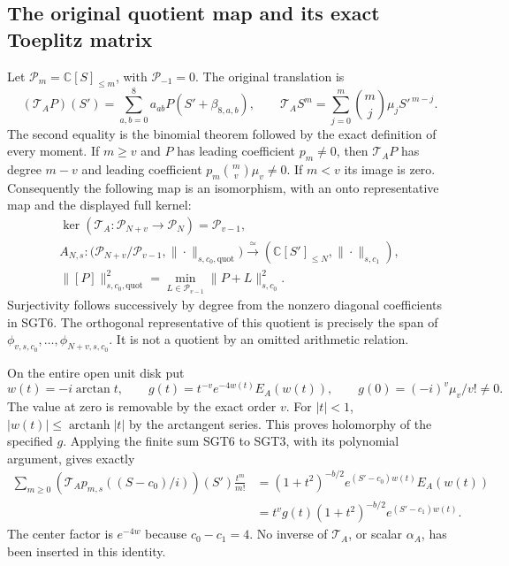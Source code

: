 \documentclass[10pt]{article}
\begin{document}
\subsection{The original quotient map and its exact Toeplitz matrix}

Let $\mathcal P_m=\mathbb C[S]_{\le m}$, with
$\mathcal P_{-1}=0$. The original translation is
\[
 (\mathcal T_AP)(S')=\sum_{a,b=0}^8
                 a_{ab}P(S'+\beta_{8,a,b}),\qquad
 \mathcal T_AS^m=
       \sum_{j=0}^m\binom mj\mu_jS'^{\,m-j}.
 \tag{SGT6}
\]
The second equality is the binomial theorem followed by the exact
definition of every moment. If $m\ge v$ and $P$ has leading coefficient
$p_m\ne0$, then $\mathcal T_AP$ has degree $m-v$ and leading coefficient
$p_m\binom mv\mu_v\ne0$. If $m<v$ its image is zero.
Consequently the following map is an isomorphism, with an onto
representative map and the displayed full kernel:
\[
\begin{gathered}
 \ker(\mathcal T_A:\mathcal P_{N+v}\longrightarrow\mathcal P_N)
       =\mathcal P_{v-1},\\
 A_{N,s}:\bigl(\mathcal P_{N+v}/\mathcal P_{v-1},
                       \|\cdot\|_{s,c_0,\mathrm{quot}}\bigr)
       \xrightarrow{\ \simeq\ }
                (\mathbb C[S']_{\le N},\|\cdot\|_{s,c_1}),\\
 \|[P]\|_{s,c_0,\mathrm{quot}}^2
       =\min_{L\in\mathcal P_{v-1}}\|P+L\|_{s,c_0}^2 .
\end{gathered}\tag{SGT7}
\]
Surjectivity follows successively by degree from the nonzero diagonal
coefficients in SGT6. The orthogonal representative of this quotient
is precisely the span of $\phi_{v,s,c_0},\ldots,\phi_{N+v,s,c_0}$.
It is not a quotient by an omitted arithmetic relation.

On the entire open unit disk put
\[
 w(t)=-i\arctan t,\qquad
 g(t)=t^{-v}e^{-4w(t)}E_A(w(t)),\qquad
 g(0)=(-i)^v\mu_v/v!\ne0 .
 \tag{SGT8}
\]
The value at zero is removable by the exact order $v$.
For $|t|<1$, $|w(t)|\le\operatorname{arctanh}|t|$ by the
arctangent series. This proves holomorphy of the specified $g$.
Applying the finite sum SGT6 to SGT3, with its polynomial argument,
gives exactly
\[
\begin{split}
 \sum_{m\ge0}(\mathcal T_Ap_{m,s}((S-c_0)/i))(S')
                   \frac{t^m}{m!}
 &= (1+t^2)^{-b/2}e^{(S'-c_0)w(t)}E_A(w(t))\\
 &=t^vg(t)(1+t^2)^{-b/2}e^{(S'-c_1)w(t)} .
\end{split}\tag{SGT9}
\]
The center factor is $e^{-4w}$ because $c_0-c_1=4$.
No inverse of $\mathcal T_A$, or scalar $\alpha_A$, has been inserted
in this identity.
\end{document}

